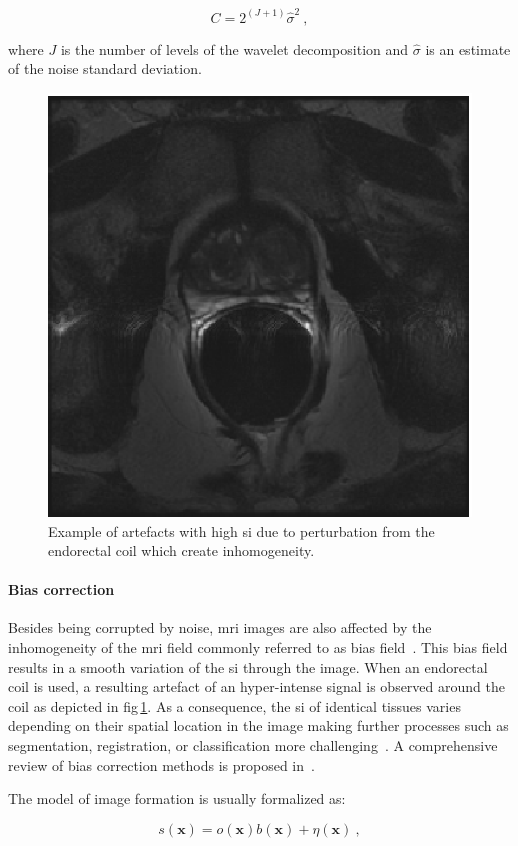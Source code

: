 \begin{equation}
	C=2^{(J+1)}\hat{\sigma}^2 \ ,
	\label{eq:nowakC}
\end{equation}

\noindent where $J$ is the number of levels of the wavelet decomposition and $\hat{\sigma}$ is an estimate of the noise standard deviation.

\begin{figure}
\centering
\includegraphics[width=0.3\linewidth]{3_review/figures/processing/pre-processing/bias/t2w_bias_antenna.eps}
\caption[Inhomogeneity artefacts due to perturbation of the endorectal coil.]{Example of artefacts with high \acs*{si} due to perturbation from the endorectal coil which create inhomogeneity.}
\label{fig:bias}
\end{figure}


\paragraph{Bias correction} Besides being corrupted by noise, \ac{mri} images are also affected by the inhomogeneity of the \ac{mri} field commonly referred to as bias field~\cite{Styner2000}.
This bias field results in a smooth variation of the \ac{si} through the image.
When an endorectal coil is used, a resulting artefact of an hyper-intense signal is observed around the coil as depicted in \acs{fig}\,\ref{fig:bias}.
As a consequence, the \ac{si} of identical tissues varies depending on their spatial location in the image making further processes such as segmentation, registration, or classification more challenging~\cite{Jungke1987,Vovk2007}.
A comprehensive review of bias correction methods is proposed in~\cite{Vovk2007}.

The model of image formation is usually formalized as:

\begin{equation}
	s(\mathbf{x}) = o(\mathbf{x})b(\mathbf{x}) + \eta(\mathbf{x}) \ ,
	\label{eq:biasmodel}
\end{equation}

